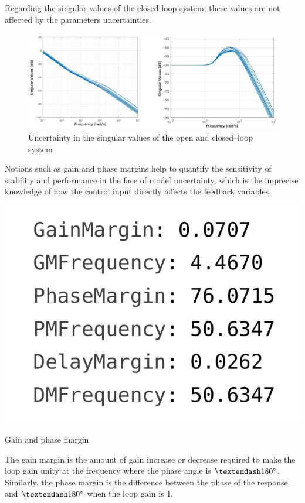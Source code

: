 Regarding the singular values of the closed-loop system, these values are not affected by the parameters uncertainties.

\begin{figure}[!h]
	\includegraphics[width=1\linewidth]{figs/06/control/singular_values_uncertainty}
	\caption{Uncertainty in the singular values of the open and closed--loop system}
\end{figure}


Notions such as gain and phase margins help to quantify the sensitivity of stability and performance in the face of model uncertainty, which is the imprecise knowledge of how the control input directly affects the feedback variables.

\begin{marginfigure}[1cm]
	\includegraphics[width=0.8\linewidth]{figs/06/control/margin}
	\caption{Gain and phase margin}
\end{marginfigure}
The gain margin is the amount of gain increase or decrease required to make the loop gain unity at the frequency where the phase angle is $–180\degree$. Similarly, the phase margin is the difference between the phase of the response and $–180\degree$ when the loop gain is 1.

